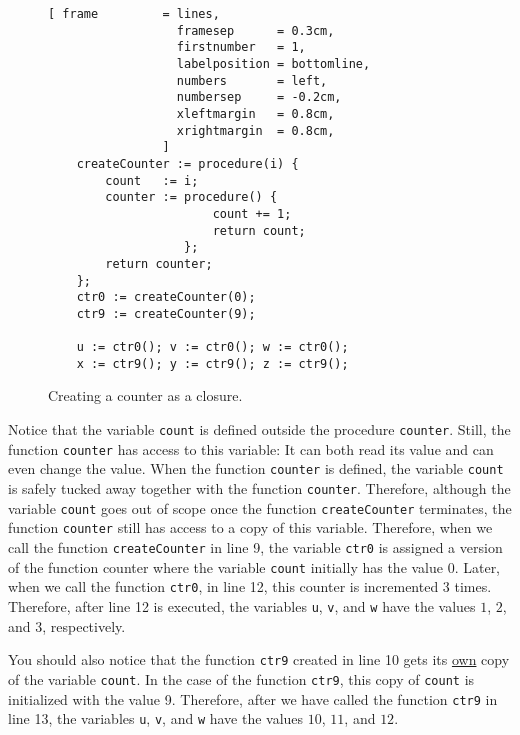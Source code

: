 \begin{figure}[!ht]
\centering
\begin{Verbatim}[ frame         = lines, 
                  framesep      = 0.3cm, 
                  firstnumber   = 1,
                  labelposition = bottomline,
                  numbers       = left,
                  numbersep     = -0.2cm,
                  xleftmargin   = 0.8cm,
                  xrightmargin  = 0.8cm,
                ]
    createCounter := procedure(i) {
        count   := i;
        counter := procedure() {
                       count += 1;
                       return count;
                   };
        return counter;
    };   
    ctr0 := createCounter(0);
    ctr9 := createCounter(9);
    
    u := ctr0(); v := ctr0(); w := ctr0();
    x := ctr9(); y := ctr9(); z := ctr9();
\end{Verbatim}
\vspace*{-0.3cm}
\caption{Creating a counter as a closure.}
\label{fig:counter-closure.stlx}
\end{figure}

Notice that the variable \texttt{count} is defined outside the procedure
\texttt{counter}.  Still, the function \texttt{counter} has access to this variable:
It can both read its value and can even change the value.  When the function \texttt{counter} is
defined, the variable \texttt{count} is safely tucked away together with the function
\texttt{counter}.  Therefore, although the variable \texttt{count} goes out of scope once the
function \texttt{createCounter} terminates, the function \texttt{counter} still has access
to a 
copy of this variable.  Therefore, when we call the function \texttt{createCounter} in line 9, 
the variable \texttt{ctr0} is assigned a version of the function counter where the variable
\texttt{count} initially has the value 0.  Later, when we call the function \texttt{ctr0},
in line 12, this counter is incremented 3 times.  Therefore, after line 12 is executed,
the variables \texttt{u}, \texttt{v}, and \texttt{w} have the values $1$, $2$, and $3$,
respectively. 

You should also notice that the function \texttt{ctr9} created in line 10 gets its
\underline{own} copy of the variable \texttt{count}.  In the case of the function
\texttt{ctr9}, this copy of \texttt{count} is initialized with the value 9.  Therefore, after
we have called the function \texttt{ctr9} in line 13, the variables \texttt{u}, \texttt{v}, and
\texttt{w} have the values $10$, $11$, and $12$. 

